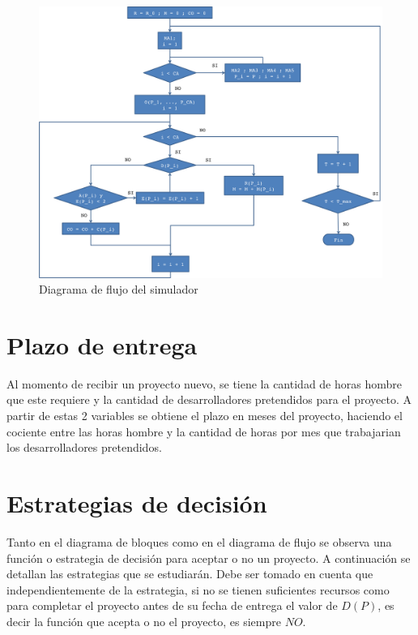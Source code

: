\begin{figure}[H]
\begin{center}
 \includegraphics[width=\textwidth,height=\textheight,keepaspectratio]{./images/flujo.png}
\end{center}

\caption{Diagrama de flujo del simulador}
\label{fig:flujo}
\end{figure}

\section{Plazo de entrega}
Al momento de recibir un proyecto nuevo, se tiene la cantidad de horas hombre que este requiere y la cantidad de desarrolladores pretendidos para el proyecto. 
A partir de estas 2 variables se obtiene el plazo en meses del proyecto, haciendo el cociente entre las horas hombre y la cantidad de horas por mes que trabajarian 
los desarrolladores pretendidos.


\section{Estrategias de decisión}

Tanto en el diagrama de bloques como en el diagrama de flujo se observa una función o estrategia de decisión para aceptar o no un proyecto. A continuación se detallan 
las estrategias que se estudiarán. Debe ser tomado en cuenta que independientemente de la estrategia, si no se tienen suficientes recursos como para completar el proyecto 
antes de su fecha de entrega el valor de $D(P)$, es decir la función que acepta o no el proyecto, es siempre $NO$.


